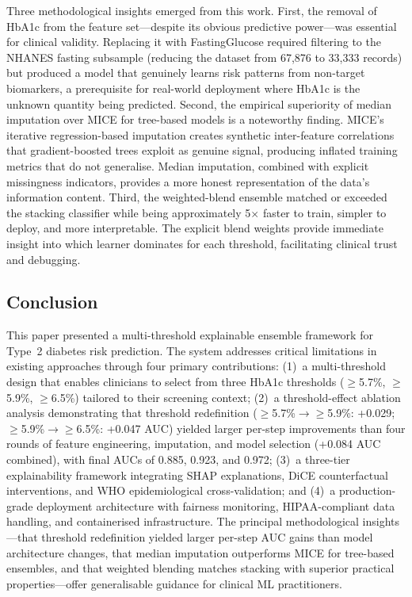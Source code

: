 \documentclass[conference]{IEEEtran}
\begin{document}
Three methodological insights emerged from this work. First, the removal of HbA1c from the feature set---despite its obvious predictive power---was essential for clinical validity. Replacing it with FastingGlucose required filtering to the NHANES fasting subsample (reducing the dataset from 67,876 to 33,333 records) but produced a model that genuinely learns risk patterns from non-target biomarkers, a prerequisite for real-world deployment where HbA1c is the unknown quantity being predicted. Second, the empirical superiority of median imputation over MICE for tree-based models is a noteworthy finding. MICE's iterative regression-based imputation creates synthetic inter-feature correlations that gradient-boosted trees exploit as genuine signal, producing inflated training metrics that do not generalise. Median imputation, combined with explicit missingness indicators, provides a more honest representation of the data's information content. Third, the weighted-blend ensemble matched or exceeded the stacking classifier while being approximately 5$\times$ faster to train, simpler to deploy, and more interpretable. The explicit blend weights provide immediate insight into which learner dominates for each threshold, facilitating clinical trust and debugging.

\subsection{Conclusion}

This paper presented a multi-threshold explainable ensemble framework for Type~2 diabetes risk prediction. The system addresses critical limitations in existing approaches through four primary contributions: (1)~a multi-threshold design that enables clinicians to select from three HbA1c thresholds ($\geq$5.7\%, $\geq$5.9\%, $\geq$6.5\%) tailored to their screening context; (2)~a threshold-effect ablation analysis demonstrating that threshold redefinition ($\geq$5.7\%$\rightarrow$$\geq$5.9\%: +0.029; $\geq$5.9\%$\rightarrow$$\geq$6.5\%: +0.047 AUC) yielded larger per-step improvements than four rounds of feature engineering, imputation, and model selection (+0.084 AUC combined), with final AUCs of 0.885, 0.923, and 0.972; (3)~a three-tier explainability framework integrating SHAP explanations, DiCE counterfactual interventions, and WHO epidemiological cross-validation; and (4)~a production-grade deployment architecture with fairness monitoring, HIPAA-compliant data handling, and containerised infrastructure. The principal methodological insights---that threshold redefinition yielded larger per-step AUC gains than model architecture changes, that median imputation outperforms MICE for tree-based ensembles, and that weighted blending matches stacking with superior practical properties---offer generalisable guidance for clinical ML practitioners.
\end{document}
